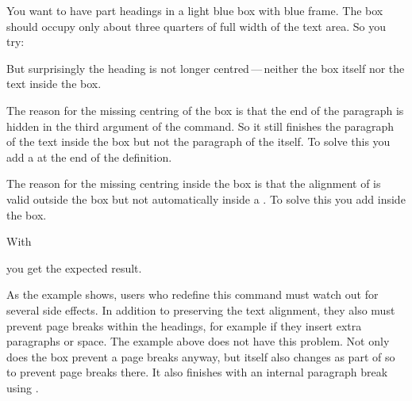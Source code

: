 \begin{Example}
  You want to have part headings in a light blue box with blue frame. The
  box should occupy only about three quarters of full width of the text
  area. So you try:
  But surprisingly the heading is not longer centred\,---\,neither the box
  itself nor the text inside the box.

  The reason for the missing centring of the box is that the end of the
  paragraph is hidden in the third argument of the command. So it still
  finishes the paragraph of the text inside the box but not the paragraph of
  the  itself. To solve this you add a  at the end of
  the definition.

  The reason for the missing centring inside the box is that the alignment of
   is valid outside the box but not
  automatically inside a . To solve this you add
   inside the box.

  With
  you get the expected result.  
\end{Example}

As the example shows, users who redefine this command must watch out for
several side effects. In addition to preserving the text alignment, they also
must prevent page breaks within the headings, for example if they insert extra
paragraphs or space. The example above does not have this problem. Not only
does the box prevent a page breaks anyway, but \KOMAScript{} itself also
changes  as part of  so to prevent page
breaks there. It also finishes  with an internal paragraph break
using .

